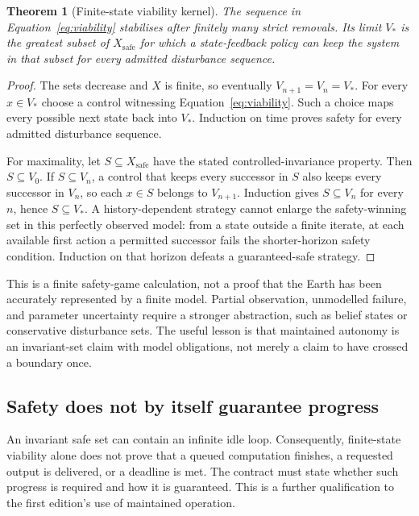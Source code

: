 \documentclass[11pt,a4paper]{article}
\newtheorem{theorem}{Theorem}[section]
\theoremstyle{definition}
\theoremstyle{remark}
\begin{document}
\begin{theorem}[Finite-state viability kernel]\label{thm:viability}
The sequence in Equation~\eqref{eq:viability} stabilises after finitely many strict removals. Its limit $V_*$ is the greatest subset of $X_{\mathrm{safe}}$ for which a state-feedback policy can keep the system in that subset for every admitted disturbance sequence.
\end{theorem}
\begin{proof}
The sets decrease and $X$ is finite, so eventually $V_{n+1}=V_n=V_*$. For every $x\in V_*$ choose a control witnessing Equation~\eqref{eq:viability}. Such a choice maps every possible next state back into $V_*$. Induction on time proves safety for every admitted disturbance sequence.

For maximality, let $S\subseteq X_{\mathrm{safe}}$ have the stated controlled-invariance property. Then $S\subseteq V_0$. If $S\subseteq V_n$, a control that keeps every successor in $S$ also keeps every successor in $V_n$, so each $x\in S$ belongs to $V_{n+1}$. Induction gives $S\subseteq V_n$ for every $n$, hence $S\subseteq V_*$. A history-dependent strategy cannot enlarge the safety-winning set in this perfectly observed model: from a state outside a finite iterate, at each available first action a permitted successor fails the shorter-horizon safety condition. Induction on that horizon defeats a guaranteed-safe strategy.
\end{proof}
This is a finite safety-game calculation, not a proof that the Earth has been accurately represented by a finite model. Partial observation, unmodelled failure, and parameter uncertainty require a stronger abstraction, such as belief states or conservative disturbance sets. The useful lesson is that maintained autonomy is an invariant-set claim with model obligations, not merely a claim to have crossed a boundary once.

\subsection{Safety does not by itself guarantee progress}\label{sec:progress}
An invariant safe set can contain an infinite idle loop. Consequently, finite-state viability alone does not prove that a queued computation finishes, a requested output is delivered, or a deadline is met. The contract must state whether such progress is required and how it is guaranteed. This is a further qualification to the first edition's use of maintained operation.
\end{document}
